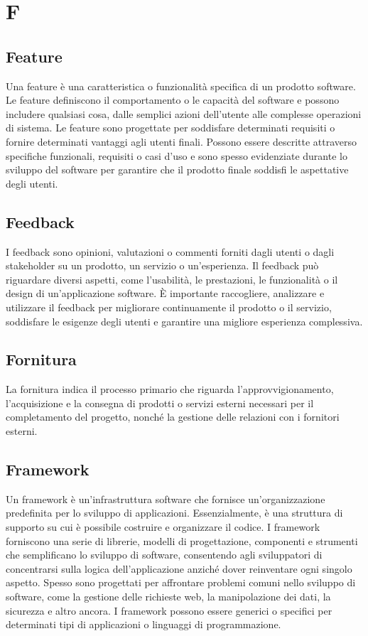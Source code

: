 \section{F} 
\subsection{Feature} 
Una feature è una caratteristica o funzionalità specifica di un prodotto software. Le feature definiscono il comportamento o le capacità del software e possono includere qualsiasi cosa, dalle semplici azioni dell'utente alle complesse operazioni di sistema. Le feature sono progettate per soddisfare determinati requisiti o fornire determinati vantaggi agli utenti finali. Possono essere descritte attraverso specifiche funzionali, requisiti o casi d'uso e sono spesso evidenziate durante lo sviluppo del software per garantire che il prodotto finale soddisfi le aspettative degli utenti.
\subsection{Feedback} 
I feedback sono opinioni, valutazioni o commenti forniti dagli utenti o dagli stakeholder su un prodotto, un servizio o un'esperienza. Il feedback può riguardare diversi aspetti, come l'usabilità, le prestazioni, le funzionalità o il design di un'applicazione software. È importante raccogliere, analizzare e utilizzare il feedback per migliorare continuamente il prodotto o il servizio, soddisfare le esigenze degli utenti e garantire una migliore esperienza complessiva.
\subsection{Fornitura} 
La fornitura indica il processo primario che riguarda l'approvvigionamento, l'acquisizione e la consegna di prodotti o servizi esterni necessari per il completamento del progetto, nonché la gestione delle relazioni con i fornitori esterni.
\subsection{Framework} 
Un framework è un'infrastruttura software che fornisce un'organizzazione predefinita per lo sviluppo di applicazioni. Essenzialmente, è una struttura di supporto su cui è possibile costruire e organizzare il codice. I framework forniscono una serie di librerie, modelli di progettazione, componenti e strumenti che semplificano lo sviluppo di software, consentendo agli sviluppatori di concentrarsi sulla logica dell'applicazione anziché dover reinventare ogni singolo aspetto. Spesso sono progettati per affrontare problemi comuni nello sviluppo di software, come la gestione delle richieste web, la manipolazione dei dati, la sicurezza e altro ancora. I framework possono essere generici o specifici per determinati tipi di applicazioni o linguaggi di programmazione.
